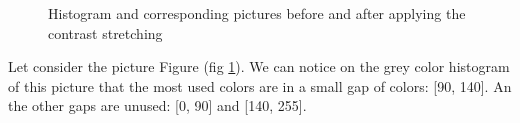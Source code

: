 \documentclass[a4paper]{article}
\begin{document}
\begin{figure}[!htb]
                \begin{minipage}{0.45\textwidth}  \end{minipage}
                \begin{minipage}{0.45\textwidth}  \end{minipage}
                \caption{Histogram and corresponding pictures before and after applying the contrast stretching}
                \label{experimentalResult.png}
			\end{figure}

	Let consider the picture Figure (fig \ref{experimentalResult.png}).   We can notice on the grey color histogram of this picture that the most used colors are in a small gap of colors: [90, 140].   An the other gaps are unused: [0, 90] and [140, 255].\\
\end{document}
